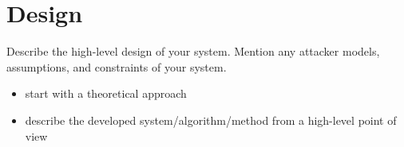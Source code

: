 \chapter{Design}

Describe the high-level design of your system.
Mention any attacker models, assumptions, and constraints of your system.

\begin{itemize}
    \item start with a theoretical approach
    \item describe the developed system/algorithm/method from a high-level point of view
\end{itemize}

